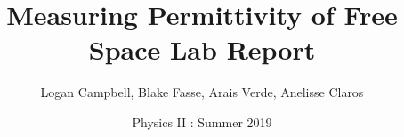 \documentclass[titlepage]{article}
\begin{document}
\title{\textbf{Measuring Permittivity of Free Space Lab Report} \bigskip}
\author{Logan Campbell, Blake Fasse, Arais Verde, Anelisse Claros \bigskip}
\date{Physics II : Summer 2019 \bigskip}
\maketitle
\pagestyle{empty}
\end{document}
